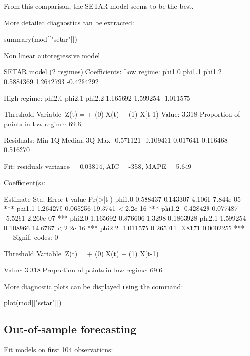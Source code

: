 \documentclass[a4paper]{article}
\begin{document}
From this comparison, the SETAR model seems to be the best.

More detailed diagnostics can be extracted:
\begin{Schunk}
\begin{Sinput}
 summary(mod[["setar"]])
\end{Sinput}
\begin{Soutput}
Non linear autoregressive model

SETAR model (2 regimes)
Coefficients:
Low regime:
    phi1.0     phi1.1     phi1.2 
 0.5884369  1.2642793 -0.4284292 

High regime:
   phi2.0    phi2.1    phi2.2 
 1.165692  1.599254 -1.011575 

Threshold
Variable: Z(t) = + (0) X(t) + (1) X(t-1)
Value: 3.318
Proportion of points in low regime: 69.6%

Residuals:
      Min        1Q    Median        3Q       Max 
-0.571121 -0.109431  0.017641  0.116468  0.516270 

Fit:
residuals variance = 0.03814,  AIC = -358, MAPE = 5.649%

Coefficient(s):

        Estimate  Std. Error  t value  Pr(>|t|)    
phi1.0  0.588437    0.143307   4.1061 7.844e-05 ***
phi1.1  1.264279    0.065256  19.3741 < 2.2e-16 ***
phi1.2 -0.428429    0.077487  -5.5291 2.260e-07 ***
phi2.0  1.165692    0.876606   1.3298 0.1863928    
phi2.1  1.599254    0.108966  14.6767 < 2.2e-16 ***
phi2.2 -1.011575    0.265011  -3.8171 0.0002255 ***
---
Signif. codes:  0  

Threshold
Variable: Z(t) = + (0) X(t) + (1) X(t-1)

Value: 3.318
Proportion of points in low regime: 69.6%
\end{Soutput}
\end{Schunk}

More diagnostic plots can be displayed using the command:
\begin{Schunk}
\begin{Sinput}
 plot(mod[["setar"]])
\end{Sinput}
\end{Schunk}

\subsection{Out-of-sample forecasting}
Fit models on first 104 observations:
\end{document}
